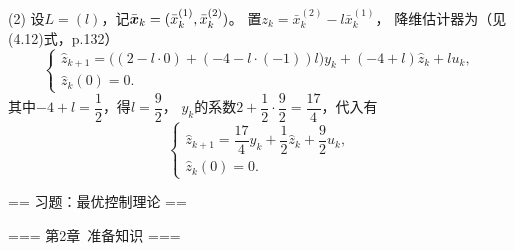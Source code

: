 \begin{itemize}
    (2) 设$L=(l)$，记$\bar{\boldsymbol{x}}_k=(\bar{x}_k^{(1)},\bar{x}_k^{(2)})$。
    置$z_k=\bar{x}_k^{(2)}-l\bar{x}_k^{(1)}$，
    降维估计器为（见\cite{LY} (4.12)式，p.132）
    \[\begin{cases}\widehat{z}_{k+1}
    =\big((2-l\cdot0)+(-4-l\cdot(-1))l\big)y_k+(-4+l)\widehat{z}_k+lu_k,\\
    \widehat{z}_k(0)=0.\end{cases}\]
    其中$-4+l=\dfrac12$，得$l=\dfrac92$，
    $y_k$的系数$2+\dfrac12\cdot\dfrac92=\dfrac{17}{4}$，代入有
    \[\begin{cases}\widehat{z}_{k+1}
    =\dfrac{17}{4}y_k+\dfrac12 \widehat{z}_k+\dfrac92 u_k,\\
    \widehat{z}_k(0)=0.\end{cases}\]
\end{itemize}

== 习题：最优控制理论 ==

=== 第2章\ 准备知识 ===

